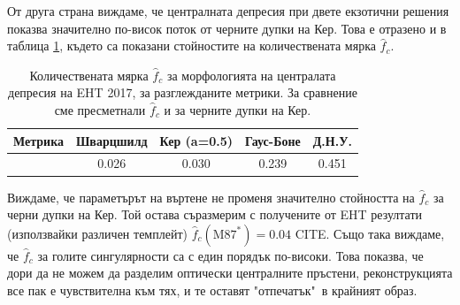 От друга страна виждаме, че централната депресия при двете екзотични решения показва значително по-висок поток от черните дупки на Кер. Това е отразено и в таблица \ref{table:f_2017}, където са показани стойностите на количествената мярка $\hat{f}_c$.

\begin{table}[h!]
	\centering
	\begin{tabular}{||c|c|c|c|c||}
		\hline
		{Метрика} & {Шварцшилд}&{Кер (a=0.5)}&{Гаус-Боне}&{Д.Н.У.}
		\\\hline
		{\thead{$\hat{f}_c$}} & 0.026&0.030&0.239&0.451
		\\\hline
	\end{tabular}
	\caption[Количествената мярка $\hat{f}_c$ за морфологията на централата депресия на EHT 2017]{Количествената мярка $\hat{f}_c$ за морфологията на централата депресия на EHT 2017, за разглежданите метрики. За сравнение сме пресметнали $\hat{f}_c$ и за черните дупки на Кер.}
	\label{table:f_2017}
\end{table}

Виждаме, че параметърът на въртене не променя значително стойността на $\hat{f}_c$ за черни дупки на Кер. Той остава съразмерим с получените от EHT резултати (използвайки различен темплейт) $\hat{f}_c(\text{M}87^*) = 0.04$ CITE. Също така виждаме, че $\hat{f}_c$ за голите сингулярности са с един порядък по-високи. Това показва, че дори да не можем да разделим оптически централните пръстени, реконструкцията все пак е чувствителна към тях, и те оставят "отпечатък"$\,$ в крайният образ.

\newpage

